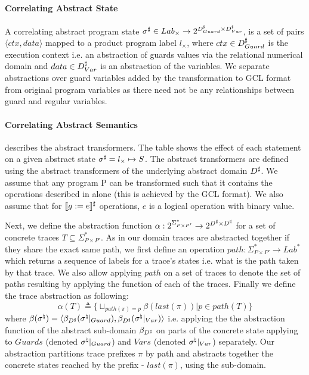 \paragraph{Correlating Abstract State} 
A correlating abstract program state $\sigma^\sharp \in Lab_{\times} \rightarrow 2^{D^\sharp_{Guard} \times D^\sharp_{Var}}$, is a set of pairs $\langle ctx, data \rangle$ mapped to a product program label $l_{\times}$, where $ctx \in D^\sharp_{Guard}$ is the execution context i.e. an abstraction of guards values via the relational numerical domain and $data \in D^\sharp_{Var}$ is an abstraction of the variables. We separate abstractions over guard variables added by the transformation to GCL format from original program variables as there need not be any relationships between guard and regular variables.



\paragraph{Correlating Abstract Semantics} 
 describes the abstract transformers. The table shows the effect of each statement on a given abstract state $\sigma^\sharp = l_{\times} \mapsto S$. The abstract transformers are defined using the abstract transformers of the underlying abstract domain $D^\sharp$. We assume that any program P can be transformed such that it contains the operations described in  alone (this is achieved by the GCL format). We also assume that for $\lbrack\!\lbrack g:=e \rbrack\!\rbrack^{\sharp}$ operations, $e$ is a logical operation with binary value.

Next, we define the abstraction function $\alpha : 2^{\Sigma^{*}_{P \times P'}} \rightarrow 2^{D^\sharp \times D^\sharp}$ for a set of concrete traces $T \subseteq \Sigma^{*}_{P \times P'}$. As in our domain traces are abstracted together if they share the exact same path, we first define an operation $path : \Sigma^{*}_{P \times P'} \rightarrow Lab^{*}$ which returns a sequence of labels for a trace's states i.e. what is the path taken by that trace. We also allow applying $path$ on a set of traces to denote the set of paths resulting by applying the function of each of the traces. Finally we define the trace abstraction as following: 
\[
\alpha(T) \triangleq \{ \sqcup_{path(\pi)=p} \beta(last(\pi)) | p \in path(T) \}
\]
where $\beta(\sigma^\natural) = \langle \beta_{D^\sharp}(\sigma^\natural|_{Guard}), \beta_{D^\sharp}(\sigma^\natural|_{Var}) \rangle$  i.e. applying the the abstraction function of the abstract sub-domain $\beta_{D^\sharp}$ on parts of the concrete state applying to $Guards$ (denoted $\sigma^\natural|_{Guard}$) and $Vars$ (denoted $\sigma^\natural|_{Var}$) separately. Our abstraction partitions trace prefixes $\pi$ by path and abstracts together the concrete states reached by the prefix - $last(\pi)$, using the sub-domain.

